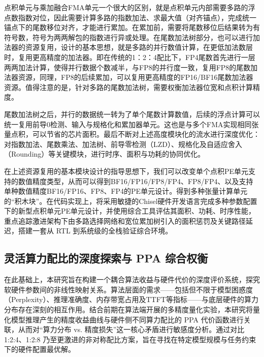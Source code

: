 \documentclass[10.5pt,compsoc,UTF8]{CjC}
\theoremstyle{mystyle}
\begin{document}
点积单元与乘加融合FMA单元一个很大的区别，就是点积单元内部需要多路的浮点数指数对位，因此需要计算多路的指数加法、求最大值（对齐锚点），完成统一锚点下的尾数移位对齐，才能进行累加。在累加前，需要将尾数移位后结果转为有符号数，符号为两两解包的指数进行异或处理。在尾数加法树部分，也可以进行加法器的资源复用，设计的基本思想，就是多路的并行数值计算，在更低加法数层时，复用更高精度的加法器。即在传统的1：2：4配比下，FP4尾数首先进行一层两两加法计算，使得并行数据个数减半，与FP8的并行度一致，复用FP8的尾数加法器资源，同理，FP8的后续累加，可以复用更高精度的FP16/BF16尾数加法器资源。值得注意的是，针对多路的尾数加法树，需要权衡加法器位宽和点积计算精度。

尾数加法树之后，并行的数据统一转为了单个尾数计算数值，后续的浮点计算可以统一复用前导0检测、输入与规格化和累加器单元。这也是与多个FMA实现相同张量点积，可以节省的芯片面积。最后不断对上述高度模块化的流水进行深度优化：对指数加法、尾数乘法、加法树、前导零检测（LZD）、规格化及自适应舍入（Rounding）等关键模块，进行时序、面积与功耗的协同优化。

在上述资源复用的基本模块设计的指导思想下，我们可以改变单个点积PE单元支持的数值精度类型，从而可以得到BF16/FP16/FP8/FP4、FP8/FP4、以及支持单种数值精度BF16/FP16、FP8、FP4的PE单元设计。得到多种张量计算单元的“积木块”。在代码实现上，将采用敏捷的Chisel硬件开发语言完成多种参数配置下的新型点积单元PE单元设计，并使用综合工具评估其面积、功耗、时序性能，重点追踪激进架构下由多路选择网络和宽位累加树引入的面积惩罚及关键路径延迟，搭建一套从 RTL 到系统级的全栈验证综合环境。
\subsection{灵活算力配比的深度探索与 PPA 综合权衡}

在此基础上，本研究旨在构建一个耦合算法收益与硬件代价的深度评价系统，探究软硬件参数间的非线性映射关系。算法层面的需求——包括但不限于模型困惑度（Perplexity）、推理准确度、内存带宽占用及TTFT等指标——与底层硬件的算力分布存在深刻的相互作用。结合前期在算法端开展的多精度量化实验，本研究将量化模型推理产生的精度收益曲线与硬件侧不同算力配比的 PPA 代价函数进行关联，从而对“算力分布 vs. 精度损失”这一核心矛盾进行敏感度分析。通过对比 1:2:4、1:2:8 乃至更激进的非对称配比方案，旨在寻找在特定模型规模与任务约束下的硬件配置最优解。
\end{document}
